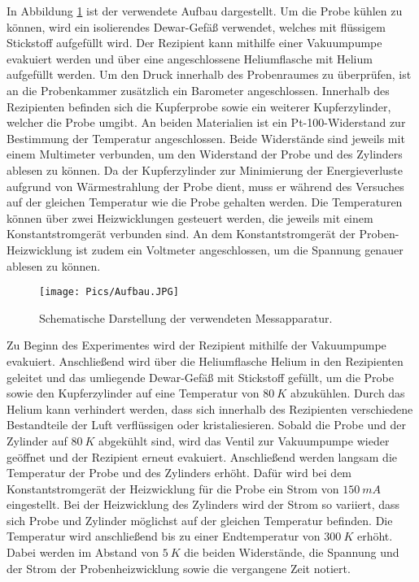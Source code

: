 In Abbildung \ref{fig:Aufbau} ist der verwendete Aufbau dargestellt. Um die Probe
kühlen zu können, wird ein isolierendes Dewar-Gefäß verwendet, welches mit flüssigem
Stickstoff aufgefüllt wird. Der Rezipient kann mithilfe einer Vakuumpumpe evakuiert
werden und über eine angeschlossene Heliumflasche mit Helium aufgefüllt werden.
Um den Druck innerhalb des Probenraumes zu überprüfen, ist an die Probenkammer
zusätzlich ein Barometer angeschlossen.
Innerhalb des Rezipienten befinden sich die Kupferprobe sowie ein weiterer Kupferzylinder,
welcher die Probe umgibt. An beiden Materialien ist ein Pt-100-Widerstand zur
Bestimmung der Temperatur angeschlossen. Beide Widerstände sind jeweils mit einem
Multimeter verbunden, um den Widerstand der Probe und des Zylinders ablesen zu können.
Da der Kupferzylinder zur Minimierung der
Energieverluste aufgrund von Wärmestrahlung der Probe dient, muss er während des
Versuches auf der gleichen Temperatur wie die Probe gehalten werden. Die Temperaturen
können über zwei Heizwicklungen gesteuert werden, die jeweils mit einem Konstantstromgerät
verbunden sind. An dem Konstantstromgerät der Proben-Heizwicklung ist zudem ein
Voltmeter angeschlossen, um die Spannung genauer ablesen zu können.

\begin{figure}
  \centering
  \texttt{[image: Pics/Aufbau.JPG]}
  \caption{Schematische Darstellung der verwendeten Messapparatur\cite{anleitung}.}
  \label{fig:Aufbau}
\end{figure}

Zu Beginn des Experimentes wird der Rezipient mithilfe der Vakuumpumpe evakuiert.
Anschließend wird über die Heliumflasche Helium in den Rezipienten geleitet und das
umliegende Dewar-Gefäß mit Stickstoff gefüllt, um die Probe sowie den Kupferzylinder
auf eine Temperatur von $\SI{80}{K}$ abzukühlen. Durch das Helium kann verhindert
werden, dass sich innerhalb des Rezipienten verschiedene Bestandteile der Luft
verflüssigen oder kristaliesieren. Sobald die Probe und der Zylinder auf $\SI{80}{K}$
abgekühlt sind, wird das Ventil zur Vakuumpumpe wieder geöffnet und der Rezipient
erneut evakuiert. Anschließend werden langsam die Temperatur der Probe und des
Zylinders erhöht. Dafür wird bei dem Konstantstromgerät der Heizwicklung für die
Probe ein Strom von $\SI{150}{mA}$ eingestellt. Bei der Heizwicklung des Zylinders
wird der Strom so variiert, dass sich Probe und Zylinder möglichst auf der gleichen
Temperatur befinden. Die Temperatur wird anschließend bis zu einer Endtemperatur
von $\SI{300}{K}$ erhöht. Dabei werden im Abstand von $\SI{5}{K}$ die beiden Widerstände,
die Spannung und der Strom der Probenheizwicklung sowie die vergangene Zeit notiert.
